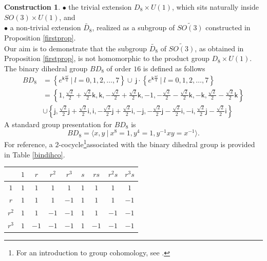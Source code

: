 \documentclass{article}
\theoremstyle{plain}
\theoremstyle{definition}
\newtheorem{const}[thm]{Construction}
\begin{document}
\begin{const}
$\bullet$ the trivial extension $D_8 \times U(1)$, which sits naturally inside $SO(3)\times U(1)$, and \\
$\bullet$ a non-trivial extension $\widetilde{D_8}$, realized as a subgroup of $\widetilde{SO(3)}$ constructed in Proposition \ref{firstprop}. \\
Our aim is to demonstrate that the subgroup $\widetilde{D_8}$ of $\widetilde{SO(3)}$, as obtained in Proposition \ref{firstprop}, is not homomorphic to the product group $D_8 \times U(1)$. \\
The binary dihedral group $BD_8$ of order $16$ is defined as follows \cite{MR1863996}
\begin{align*}
BD_8 & = \left\{e^{\mathsf{k}\frac{\pi l}{4}} ~ \big\vert ~ l = 0,1,2,\dots,7\right\} \cup ~ \mathsf{j} \cdot \left\{e^{\mathsf{k}\frac{\pi l}{4}} ~ \big\vert ~ l = 0,1,2,\dots,7\right\} \\
& = \left\{1,\frac{\sqrt{2}}{2} + \frac{\sqrt{2}}{2} \mathsf{k},\mathsf{k},-\frac{\sqrt{2}}{2} + \frac{\sqrt{2}}{2} \mathsf{k},-1,-\frac{\sqrt{2}}{2} - \frac{\sqrt{2}}{2} \mathsf{k},-\mathsf{k},\frac{\sqrt{2}}{2} - \frac{\sqrt{2}}{2} \mathsf{k}\right\} \\
& \cup \left\{\mathsf{j},\frac{\sqrt{2}}{2} \mathsf{j} + \frac{\sqrt{2}}{2} \mathsf{i},\mathsf{i},-\frac{\sqrt{2}}{2} \mathsf{j} + \frac{\sqrt{2}}{2} \mathsf{i},-\mathsf{j},-\frac{\sqrt{2}}{2} \mathsf{j} - \frac{\sqrt{2}}{2} \mathsf{i},-\mathsf{i},\frac{\sqrt{2}}{2} \mathsf{j} - \frac{\sqrt{2}}{2} \mathsf{i}\right\}
\end{align*}
A standard group presentation for $BD_8$ is
\[
BD_8 = \langle x,y ~ \big\vert ~ x^8 = 1, y^4 = 1, y^{-1}xy=x^{-1} \rangle.
\]
For reference, a $2$-cocycle\footnote{For an introduction to group cohomology, see \cite[Section 1 in Chapter 3]{MR672956}.}associated with the binary dihedral group is provided in Table \ref{bindihco}.
\begin{table}[H]
\centering
\begin{tabular}{ c | c | c | c | c | c | c | c | c }
& $1$ & $r$ & $r^2$ & $r^3$ & $s$ & $rs$ & $r^2s$ & $r^3s$ \\
\hline
$1$ & $1$ & $1$ & $1$ & $1$ & $1$ & $1$ & $1$ & $1$ \\
\hline
$r$ & $1$ & $1$ & $1$ & $-1$ & $1$ & $1$ & $1$ & $-1$ \\
\hline
$r^2$ & $1$ & $1$ & $-1$ & $-1$ & $1$ & $1$ & $-1$ & $-1$ \\
\hline
$r^3$ & $1$ & $-1$ & $-1$ & $-1$ & $1$ & $-1$ & $-1$ & $-1$ \\

\end{tabular}
\end{table}
\end{const}
\end{document}

